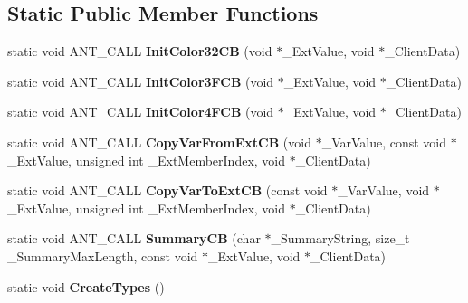 \subsection*{Static Public Member Functions}
\begin{DoxyCompactItemize}
\item 
\hypertarget{struct_c_color_ext_a06d8f83672db6517133d978d0965c0e7}{static void A\+N\+T\+\_\+\+C\+A\+L\+L {\bfseries Init\+Color32\+C\+B} (void $\ast$\+\_\+\+Ext\+Value, void $\ast$\+\_\+\+Client\+Data)}\label{struct_c_color_ext_a06d8f83672db6517133d978d0965c0e7}

\item 
\hypertarget{struct_c_color_ext_a73bd2385f1433a215bae3b20b90ec1b7}{static void A\+N\+T\+\_\+\+C\+A\+L\+L {\bfseries Init\+Color3\+F\+C\+B} (void $\ast$\+\_\+\+Ext\+Value, void $\ast$\+\_\+\+Client\+Data)}\label{struct_c_color_ext_a73bd2385f1433a215bae3b20b90ec1b7}

\item 
\hypertarget{struct_c_color_ext_af221fb513ab7894bead7f0f39567e8b4}{static void A\+N\+T\+\_\+\+C\+A\+L\+L {\bfseries Init\+Color4\+F\+C\+B} (void $\ast$\+\_\+\+Ext\+Value, void $\ast$\+\_\+\+Client\+Data)}\label{struct_c_color_ext_af221fb513ab7894bead7f0f39567e8b4}

\item 
\hypertarget{struct_c_color_ext_a42ffded76733a312e1538532ddc7c12d}{static void A\+N\+T\+\_\+\+C\+A\+L\+L {\bfseries Copy\+Var\+From\+Ext\+C\+B} (void $\ast$\+\_\+\+Var\+Value, const void $\ast$\+\_\+\+Ext\+Value, unsigned int \+\_\+\+Ext\+Member\+Index, void $\ast$\+\_\+\+Client\+Data)}\label{struct_c_color_ext_a42ffded76733a312e1538532ddc7c12d}

\item 
\hypertarget{struct_c_color_ext_af441ef6e4b0dfcb7b733f05203ee14b8}{static void A\+N\+T\+\_\+\+C\+A\+L\+L {\bfseries Copy\+Var\+To\+Ext\+C\+B} (const void $\ast$\+\_\+\+Var\+Value, void $\ast$\+\_\+\+Ext\+Value, unsigned int \+\_\+\+Ext\+Member\+Index, void $\ast$\+\_\+\+Client\+Data)}\label{struct_c_color_ext_af441ef6e4b0dfcb7b733f05203ee14b8}

\item 
\hypertarget{struct_c_color_ext_a3d194a08e794f1152dc5b43aeadc9f1f}{static void A\+N\+T\+\_\+\+C\+A\+L\+L {\bfseries Summary\+C\+B} (char $\ast$\+\_\+\+Summary\+String, size\+\_\+t \+\_\+\+Summary\+Max\+Length, const void $\ast$\+\_\+\+Ext\+Value, void $\ast$\+\_\+\+Client\+Data)}\label{struct_c_color_ext_a3d194a08e794f1152dc5b43aeadc9f1f}

\item 
\hypertarget{struct_c_color_ext_a45d77650285c5389a74b6f8f71f1f4b6}{static void {\bfseries Create\+Types} ()}\label{struct_c_color_ext_a45d77650285c5389a74b6f8f71f1f4b6}

\end{DoxyCompactItemize}
